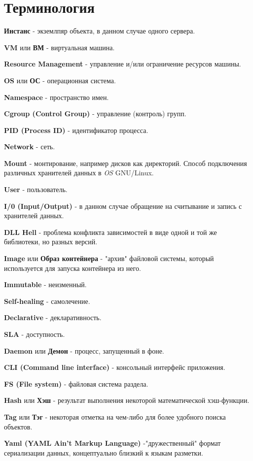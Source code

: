 \chapter{Терминология}
\label{cha:terms}

\textbf{Инстанс} - экземлпяр объекта, в данном случае одного сервера.

\textbf{VM} или \textbf{ВМ} - виртуальная машина.

\textbf{Resource Management} - управление и/или ограничение ресурсов машины.

\textbf{OS} или \textbf{ОС} - операционная система.

\textbf{Namespace} - пространство имен.

\textbf{Cgroup (Control Group)} - управление (контроль) групп.

\textbf{PID (Process ID)} - идентификатор процесса.

\textbf{Network} - сеть.

\textbf{Mount} - монтирование, например дисков как директорий. Способ подключения различных хранителей данных в \textit{OS} GNU/Linux.

\textbf{User} - пользователь.

\textbf{I/0 (Input/Output)} - в данном случае обращение на считывание и запись с хранителей данных.

\textbf{DLL Hell} - проблема конфликта зависимостей в виде одной и той же библиотеки, но разных версий.

\textbf{Image} или \textbf{Образ контейнера} - "архив" файловой системы, который используется для запуска контейнера из него.

\textbf{Immutable} - неизменный.

\textbf{Self-healing} - самолечение.

\textbf{Declarative} - декларативность.

\textbf{SLA} - доступность.

\textbf{Daemon} или \textbf{Демон} - процесс, запущенный в фоне.

\textbf{CLI (Command line interface)} - консольный интерфейс приложения.

\textbf{FS (File system)} - файловая система раздела.

\textbf{Hash} или \textbf{Хэш} - результат выполнения некоторой математической хэш-функции.

\textbf{Tag} или \textbf{Тэг} - некоторая отметка на чем-либо для более удобного поиска объектов.

\textbf{Yaml (YAML Ain't Markup Language)} -"дружественный" формат сериализации данных, концептуально близкий к языкам разметки.

